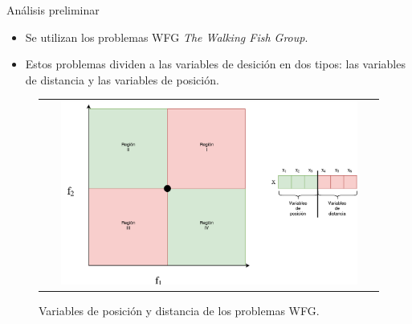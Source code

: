 \documentclass{beamer}
\begin{document}



\begin{frame}{Análisis preliminar}
\begin{itemize}
\scriptsize
\justifying
\item Se utilizan los problemas WFG \textit{The Walking Fish Group}.
\justifying
\item Estos problemas dividen a las variables de desición en dos tipos: las variables de distancia y las variables de posición.
\end{itemize}
\begin{figure}
\centering
\begin{tabular}{c}
 \includegraphics[width=0.9\textwidth]{Parametros_Posicion_Distancia.pdf}   \\
\end{tabular}
\caption{Variables de posición y distancia de los problemas WFG.}
\end{figure}
\end{frame}
\end{document}

